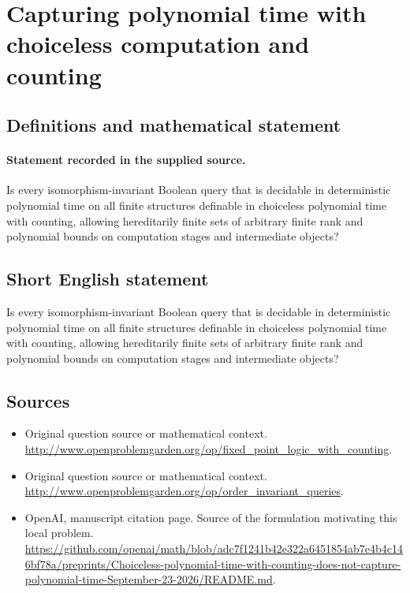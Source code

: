 \documentclass[11pt]{article}
\begin{document}
\section*{Capturing polynomial time with choiceless computation and counting}\label{statement}
\subsection{Definitions and mathematical statement}
\paragraph{Statement recorded in the supplied source.}
Is every isomorphism-invariant Boolean query that is decidable in deterministic polynomial time on all finite structures definable in choiceless polynomial time with counting, allowing hereditarily finite sets of arbitrary finite rank and polynomial bounds on computation stages and intermediate objects?
\subsection{Short English statement}
Is every isomorphism-invariant Boolean query that is decidable in deterministic polynomial time on all finite structures definable in choiceless polynomial time with counting, allowing hereditarily finite sets of arbitrary finite rank and polynomial bounds on computation stages and intermediate objects?
\subsection{Sources}
\begin{itemize}
\item[S1] Original question source or mathematical context.
\url{http://www.openproblemgarden.org/op/fixed_point_logic_with_counting}.
\item[S2] Original question source or mathematical context.
\url{http://www.openproblemgarden.org/op/order_invariant_queries}.
\item[S3] OpenAI, manuscript citation page. Source of the formulation motivating this local problem.
\url{https://github.com/openai/math/blob/adc7f1241b42e322a6451854ab7e4b4c146bf78a/preprints/Choiceless-polynomial-time-with-counting-does-not-capture-polynomial-time-September-23-2026/README.md}.
\end{itemize}
\end{document}
